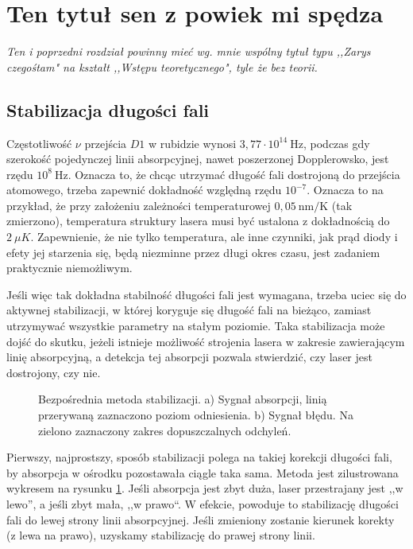 \documentclass[a4paper,10pt]{article}
\begin{document}
\section{Ten tytuł sen z powiek mi spędza}

\emph{Ten i poprzedni rozdział powinny mieć wg. mnie wspólny tytuł typu ,,Zarys czegośtam" na kształt ,,Wstępu teoretycznego", tyle że bez teorii.}

\subsection{Stabilizacja długości fali}

Częstotliwość $\nu$ przejścia $D1$ w rubidzie wynosi $3{,}77 \cdot 10^{14}~
\mathrm{Hz}$, podczas gdy szerokość pojedynczej linii absorpcyjnej,
nawet poszerzonej Dopplerowsko, jest rzędu $10^8~\mathrm{Hz}$. Oznacza to, że 
chcąc utrzymać długość fali dostrojoną do przejścia atomowego,
trzeba zapewnić dokładność względną rzędu $10^{-7}$. Oznacza to na przykład, że przy założeniu zależności temperaturowej $0{,}05 ~\mathrm{nm/K}$ (tak zmierzono), temperatura struktury lasera musi być ustalona z dokładnością do $2~\mu K$. Zapewnienie,
że nie tylko temperatura, ale inne czynniki, jak prąd diody i efety jej 
starzenia się, będą niezminne przez długi okres czasu, jest zadaniem 
praktycznie niemożliwym.

Jeśli więc tak dokładna stabilność długości fali jest wymagana, trzeba uciec się do aktywnej 
stabilizacji, w której koryguje się długość fali na bieżąco, zamiast utrzymywać 
wszystkie parametry na stałym poziomie.
Taka stabilizacja może dojść do skutku, jeżeli istnieje możliwość strojenia 
lasera w zakresie zawierającym linię absorpcyjną, a detekcja tej absorpcji pozwala stwierdzić, czy laser jest dostrojony, czy nie.

\begin{figure}
\caption{Bezpośrednia metoda stabilizacji. a) Sygnał absorpcji, linią przerywaną zaznaczono poziom odniesienia. b) Sygnał błędu. Na zielono zaznaczony zakres dopuszczalnych odchyleń.}
\label{fig:lock1}
\end{figure} 


Pierwszy, najprostszy, sposób stabilizacji polega na takiej korekcji długości 
fali, by absorpcja w ośrodku pozostawała ciągle taka sama.
Metoda jest zilustrowana wykresem na rysunku \ref{fig:lock1}. Jeśli absorpcja 
jest zbyt duża, laser przestrajany jest ,,w lewo'', a jeśli zbyt mała, ,,w 
prawo``.
W efekcie, powoduje to stabilizację długości fali do lewej strony linii absorpcyjnej.
Jeśli zmieniony zostanie kierunek korekty (z lewa na prawo), uzyskamy stabilizację do prawej strony linii.
\end{document}
